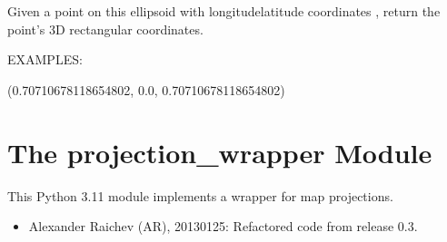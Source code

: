 \documentclass[a4paper,12ptopenany,oneside,english]{sphinxmanual}
\begin{document}
\begin{fulllineitems}
\begin{fulllineitems}
\label{\detokenize{ellipsoids:rhealpixdggs.ellipsoids.Ellipsoid.xyz}}
\pysigstartsignatures
{}
\pysigstopsignatures
\sphinxAtStartPar
Given a point on this ellipsoid with longitude\sphinxhyphen{}latitude coordinates
, return the point’s 3D rectangular coordinates.

\sphinxAtStartPar
EXAMPLES:

\begin{sphinxVerbatim}[commandchars=\\\{\}]
  
  
\end{sphinxVerbatim}
\begin{description}
\sphinxAtStartPar
(0.70710678118654802, 0.0, 0.70710678118654802)

\end{description}

\end{fulllineitems}


\end{fulllineitems}


\sphinxstepscope


\chapter{The projection\_wrapper Module}
\label{\detokenize{projection_wrapper:module-rhealpixdggs.projection_wrapper}}\label{\detokenize{projection_wrapper:the-projection-wrapper-module}}\label{\detokenize{projection_wrapper::doc}}
\sphinxAtStartPar
This Python 3.11 module implements a wrapper for map projections.
\begin{itemize}
\item {} 
\sphinxAtStartPar
Alexander Raichev (AR), 2013\sphinxhyphen{}01\sphinxhyphen{}25: Refactored code from release 0.3.

\end{itemize}
\end{document}

